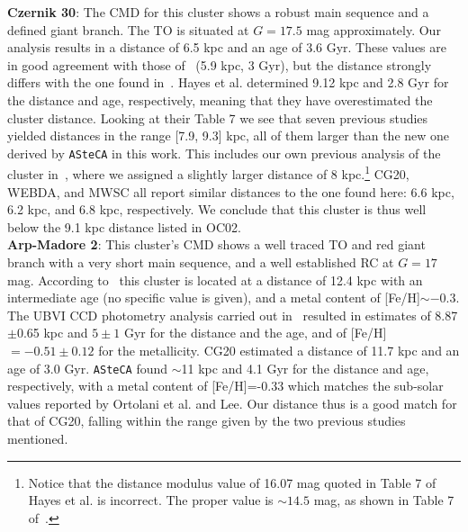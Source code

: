 \documentclass[referee]{aa}
\begin{document}
\begin{appendix}
  \noindent \textbf{Czernik 30}: The CMD for this cluster shows a robust main sequence
  and a defined giant branch. The TO is situated at $G=17.5$ mag approximately.
  Our analysis results in a distance of 6.5 kpc and an age of 3.6 Gyr. These
  values are in good agreement with those of~\cite{Dias_2021} (5.9 kpc, 3 Gyr),
  but the distance strongly differs with the one found in~\cite{Hayes_2015}.
  Hayes et al. determined 9.12 kpc and 2.8 Gyr for the distance and age,
  respectively, meaning that they have overestimated the cluster distance.
  Looking at their Table 7 we see that seven previous studies yielded distances
  in the range [7.9, 9.3] kpc, all of them larger than the new one derived by
  \texttt{ASteCA} in this work. This includes our own previous analysis of the
  cluster in~\cite{Perren_2015}, where we assigned a slightly larger distance of
  8 kpc.\footnote{Notice that the distance modulus value of 16.07 mag quoted in
  Table 7 of Hayes et al. is incorrect. The proper value is $\sim14.5$ mag, as
  shown in Table 7 of~\cite{Perren_2015}.}
  CG20, WEBDA, and MWSC all report similar distances to the one found here:
  6.6 kpc, 6.2 kpc, and 6.8 kpc, respectively. We conclude that this cluster
  is thus well below the 9.1 kpc distance listed in OC02.\\

  \noindent \textbf{Arp-Madore 2}: This cluster's CMD shows a well traced TO and
  red giant branch with a very short main sequence, and a
  well established RC at $G=17$ mag.
  According to~\cite{Ortolani_1995} this cluster is located at a distance of
  12.4 kpc with an intermediate age (no specific value is given), and a metal
  content of [Fe/H]$\sim-0.3$.
  The UBVI CCD photometry analysis carried out in~\cite{Lee_1997} resulted in
  estimates of 8.87$\pm$0.65 kpc and $5\pm1$ Gyr for the distance and the age,
  and of [Fe/H]$=-0.51\pm0.12$ for the metallicity.
  CG20 estimated a distance of 11.7 kpc and an age of 3.0 Gyr.
  \texttt{ASteCA} found $\sim$11 kpc and 4.1 Gyr for the distance and
  age, respectively, with a metal content of [Fe/H]=-0.33 which matches the
  sub-solar values reported by Ortolani et al. and Lee.
  Our distance thus is a good match for that of CG20, falling within the range
  given by the two previous studies mentioned.\\


\end{appendix}
\end{document}
